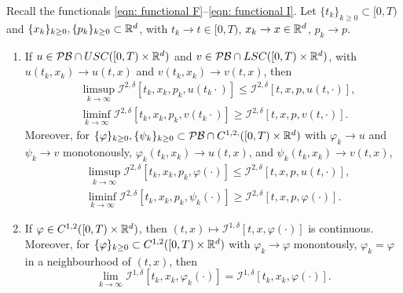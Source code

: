 \begin{proposition}
\label{prop: Proposition 5.1 in Seydel}
    Recall the functionals \eqref{eqn: functional F}--\eqref{eqn: functional I}. Let $\{t_k\}_{k \geq 0} \subset [0,T)$ and $\{x_k\}_{k \geq 0}, \{p_k\}_{k \geq 0} \subset \mathbb{R}^d$, with $t_k \rightarrow t \in [0,T)$, $x_k \rightarrow x \in \mathbb{R}^d$, $p_k \rightarrow p$. 

    \begin{enumerate}[label=(\roman*)]
        \item If $u \in \mathcal{PB} \cap USC([0,T)\times \mathbb{R}^d)$ and $v \in \mathcal{PB} \cap LSC([0,T)\times \mathbb{R}^d)$, with $u(t_k,x_k) \rightarrow u(t,x)$ and $v(t_k,x_k) \rightarrow v(t,x)$, then
        \begin{align*}
            &\limsup_{k \rightarrow \infty} \mathcal{I}^{2,\delta}[t_k,x_k,p_k,u(t_k\cdot)] \leq \mathcal{I}^{2,\delta} [t,x,p,u(t,\cdot)], \\
            &\liminf_{k \rightarrow \infty} \mathcal{I}^{2,\delta}[t_k, x_k, p_k, v(t_k\cdot)] \geq \mathcal{I}^{2, \delta}[t,x,p,v(t,\cdot)].
        \end{align*}
        Moreover, for $\{\varphi\}_{k \geq 0}, \{\psi_k\}_{k \geq 0} \subset \mathcal{PB} \cap C^{1,2,}([0,T) \times \mathbb{R}^d)$ with $\varphi_k \rightarrow u$ and $\psi_k \rightarrow v$ monotonously, $\varphi_k(t_k,x_k) \rightarrow u(t,x)$, and $\psi_k(t_k,x_k) \rightarrow v(t,x)$,
        \begin{align*}
            & \limsup_{k \rightarrow \infty} \mathcal{I}^{2,\delta}[t_k,x_k,p_k,\varphi(\cdot)] \leq \mathcal{I}^{2,\delta}[t,x,p,u(t,\cdot)], \\
            & \liminf_{k \rightarrow \infty} \mathcal{I}^{2,\delta} [t_k,x_k,p_k,\psi_k(\cdot)] \geq \mathcal{I}^{2,\delta}[t,x,p,\varphi(\cdot)].
        \end{align*}
        
        \item If $\varphi \in C^{1,2}([0,T) \times \mathbb{R}^d)$, then $(t,x) \mapsto \mathcal{I}^{1,\delta}[t,x,\varphi(\cdot)]$ is continuous. Moreover, for $\{\varphi\}_{k \geq 0} \subset C^{1,2}([0,T) \times \mathbb{R}^d)$ with $\varphi_k \rightarrow \varphi$ monontously, $\varphi_k = \varphi$ in a neighbourhood of $(t,x)$, then
        \begin{equation*}
            \lim_{k \rightarrow \infty} \mathcal{I}^{1,\delta}[t_k,x_k,\varphi_k(\cdot)] = \mathcal{I}^{1,\delta}[t_k,x_k,\varphi(\cdot)]. 
        \end{equation*}
        

\end{enumerate}
\end{proposition}
